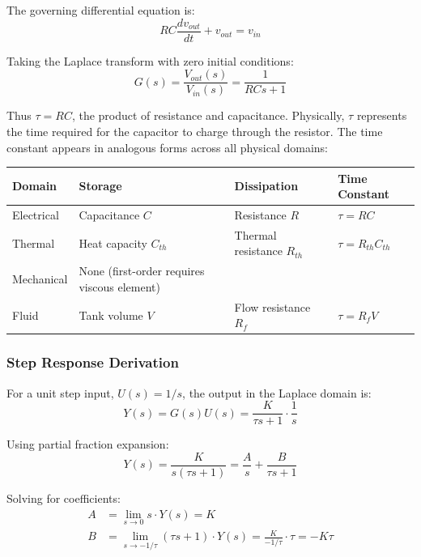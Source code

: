 The governing differential equation is:
\begin{equation}
RC\frac{dv_{out}}{dt} + v_{out} = v_{in}
\end{equation}

Taking the Laplace transform with zero initial conditions:
\begin{equation}
G(s) = \frac{V_{out}(s)}{V_{in}(s)} = \frac{1}{RCs + 1}
\end{equation}

Thus $\tau = RC$, the product of resistance and capacitance. Physically, $\tau$ represents the time required for the capacitor to charge through the resistor. The time constant appears in analogous forms across all physical domains:

\begin{center}
\begin{tabular}{llll}
\toprule
\textbf{Domain} & \textbf{Storage} & \textbf{Dissipation} & \textbf{Time Constant} \\
\midrule
Electrical & Capacitance $C$ & Resistance $R$ & $\tau = RC$ \\
Thermal & Heat capacity $C_{th}$ & Thermal resistance $R_{th}$ & $\tau = R_{th}C_{th}$ \\
Mechanical & None (first-order requires viscous element) & & \\
Fluid & Tank volume $V$ & Flow resistance $R_f$ & $\tau = R_f V$ \\
\bottomrule
\end{tabular}
\end{center}

\subsubsection{Step Response Derivation}

For a unit step input, $U(s) = 1/s$, the output in the Laplace domain is:
\begin{equation}
Y(s) = G(s)U(s) = \frac{K}{\tau s + 1} \cdot \frac{1}{s}
\end{equation}

Using partial fraction expansion:
\begin{equation}
Y(s) = \frac{K}{s(\tau s + 1)} = \frac{A}{s} + \frac{B}{\tau s + 1}
\end{equation}

Solving for coefficients:
\begin{align}
A &= \lim_{s \to 0} s \cdot Y(s) = K \\
B &= \lim_{s \to -1/\tau} (\tau s + 1) \cdot Y(s) = \frac{K}{-1/\tau} \cdot \tau = -K\tau
\end{align}

